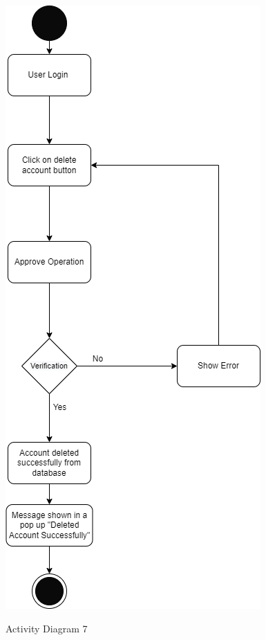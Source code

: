 \begin{figure}[H]
    \centering
    \caption{Activity Diagram 7}
    \includegraphics[scale=0.5]{./diagrams/Activity Diagram/ad-07.png}
    \label{fig:act-07}

\end{figure}


